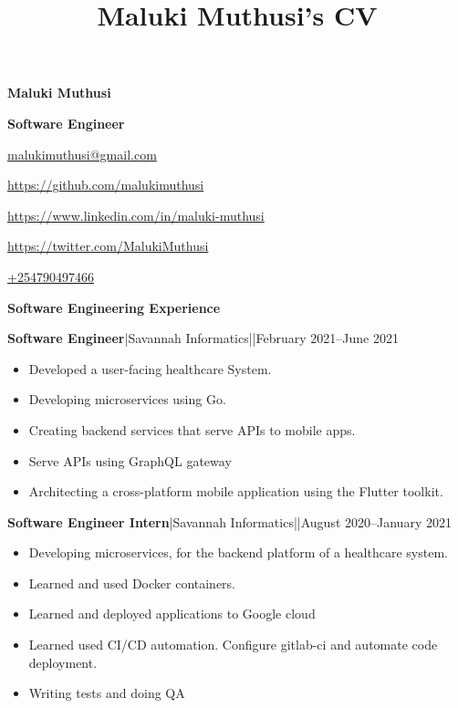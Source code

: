 \documentclass[a4paper]{article}
\begin{document}
\title{Maluki Muthusi's CV}

\begin{center}
    {\Large \textbf{Maluki Muthusi}} \par

    {\large \textbf{Software Engineer}}
\end{center}

\begin{description}[noitemsep]
    \item[\textbf{Email:}] \href{mailto:malukimuthusi@gmail.com}{malukimuthusi@gmail.com}
    \item[\textbf{Github:}] \url{https://github.com/malukimuthusi}
        \item[\textbf{LinkedIn:}]\url{https://www.linkedin.com/in/maluki-muthusi}
        \item[\textbf{Twitter:}]\url{https://twitter.com/MalukiMuthusi}
        \item[\textbf{Contact:}]\url{+254790497466}
\end{description}


\begin{center}
    {\Large \textbf{Software Engineering Experience}}
\end{center}

\textbf{Software Engineer}|Savannah Informatics||February 2021--June 2021

\begin{itemize}[noitemsep]
    \item Developed a user-facing healthcare System.
    \item Developing microservices using Go.
    \item Creating backend services that serve APIs to mobile apps.
    \item Serve APIs using GraphQL gateway
    \item Architecting a cross-platform mobile application using the Flutter toolkit.

\end{itemize}


\textbf{Software Engineer Intern}|Savannah Informatics||August 2020--January 2021

\begin{itemize}[noitemsep]
    \item  Developing microservices, for the backend platform of a healthcare system.
    \item Learned and used Docker containers.
    \item Learned and deployed applications to Google cloud
    \item Learned used CI/CD automation. Configure gitlab-ci and automate code deployment.
    \item Writing tests and doing QA
\end{itemize}
\end{document}

